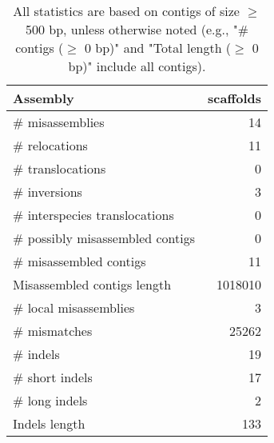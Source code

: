 \documentclass[12pt,a4paper]{article}
\begin{document}
\begin{table}[ht]
\begin{center}
\caption{All statistics are based on contigs of size $\geq$ 500 bp, unless otherwise noted (e.g., "\# contigs ($\geq$ 0 bp)" and "Total length ($\geq$ 0 bp)" include all contigs).}
\begin{tabular}{|l*{1}{|r}|}
\hline
Assembly & scaffolds \\ \hline
\# misassemblies & 14 \\ \hline
\hspace{5mm}\# relocations & 11 \\ \hline
\hspace{5mm}\# translocations & 0 \\ \hline
\hspace{5mm}\# inversions & 3 \\ \hline
\hspace{5mm}\# interspecies translocations & 0 \\ \hline
\# possibly misassembled contigs & 0 \\ \hline
\# misassembled contigs & 11 \\ \hline
Misassembled contigs length & 1018010 \\ \hline
\# local misassemblies & 3 \\ \hline
\# mismatches & 25262 \\ \hline
\# indels & 19 \\ \hline
\hspace{5mm}\# short indels & 17 \\ \hline
\hspace{5mm}\# long indels & 2 \\ \hline
Indels length & 133 \\ \hline
\end{tabular}
\end{center}
\end{table}
\end{document}
